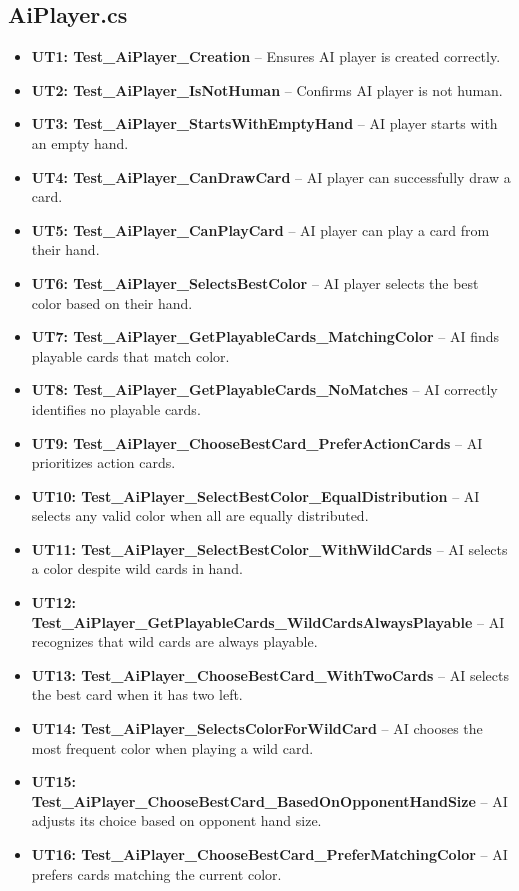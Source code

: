 \documentclass[12pt, titlepage]{article}
\begin{document}
\subsection{AiPlayer.cs}
\begin{itemize}
    \item \textbf{UT1: Test\_AiPlayer\_Creation} -- Ensures AI player is created correctly.
    \item \textbf{UT2: Test\_AiPlayer\_IsNotHuman} -- Confirms AI player is not human.
    \item \textbf{UT3: Test\_AiPlayer\_StartsWithEmptyHand} -- AI player starts with an empty hand.
    \item \textbf{UT4: Test\_AiPlayer\_CanDrawCard} -- AI player can successfully draw a card.
    \item \textbf{UT5: Test\_AiPlayer\_CanPlayCard} -- AI player can play a card from their hand.
    \item \textbf{UT6: Test\_AiPlayer\_SelectsBestColor} -- AI player selects the best color based on their hand.
    \item \textbf{UT7: Test\_AiPlayer\_GetPlayableCards\_MatchingColor} -- AI finds playable cards that match color.
    \item \textbf{UT8: Test\_AiPlayer\_GetPlayableCards\_NoMatches} -- AI correctly identifies no playable cards.
    \item \textbf{UT9: Test\_AiPlayer\_ChooseBestCard\_PreferActionCards} -- AI prioritizes action cards.
    \item \textbf{UT10: Test\_AiPlayer\_SelectBestColor\_EqualDistribution} -- AI selects any valid color when all are equally distributed.
    \item \textbf{UT11: Test\_AiPlayer\_SelectBestColor\_WithWildCards} -- AI selects a color despite wild cards in hand.
    \item \textbf{UT12: Test\_AiPlayer\_GetPlayableCards\_WildCardsAlwaysPlayable} -- AI recognizes that wild cards are always playable.
    \item \textbf{UT13: Test\_AiPlayer\_ChooseBestCard\_WithTwoCards} -- AI selects the best card when it has two left.
    \item \textbf{UT14: Test\_AiPlayer\_SelectsColorForWildCard} -- AI chooses the most frequent color when playing a wild card.
    \item \textbf{UT15: Test\_AiPlayer\_ChooseBestCard\_BasedOnOpponentHandSize} -- AI adjusts its choice based on opponent hand size.
    \item \textbf{UT16: Test\_AiPlayer\_ChooseBestCard\_PreferMatchingColor} -- AI prefers cards matching the current color.
\end{itemize}
\end{document}
